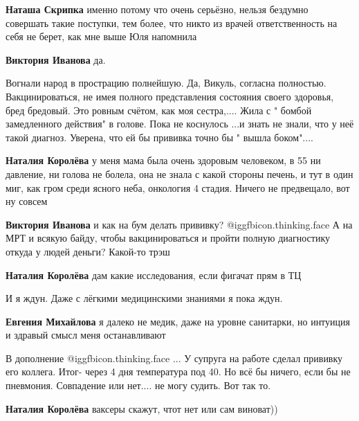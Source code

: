 \begin{itemize}
\begin{itemize} %
\textbf{Наташа Скрипка} именно потому что очень серьёзно, нельзя бездумно совершать такие поступки, тем более, что никто из врачей ответственность на себя не берет, как мне выше Юля напомнила

\textbf{Виктория Иванова} да.
\end{itemize} %


Вогнали народ в прострацию полнейшую. Да, Викуль, согласна полностью.
Вакцинироваться, не имея полного представления состояния своего здоровья, бред
бредовый. Это ровным счётом, как моя сестра,.... Жила с " бомбой замедленного
действия" в голове. Пока не коснулось ...и знать не знали, что у неё такой
диагноз. Уверена, что ей бы прививка точно бы " вышла боком"....

\begin{itemize} %
\textbf{Наталия Королёва} у меня мама была очень здоровым человеком, в 55 ни давление, ни голова не болела, она не знала с какой стороны печень, и тут в один миг, как гром среди ясного неба, онкология 4 стадия. Ничего не предвещало, вот ну совсем

\textbf{Виктория Иванова} и как на бум делать прививку?  @igg{fbicon.thinking.face}  А на МРТ и всякую байду, чтобы вакцинироваться и пройти полную диагностику откуда у людей деньги? Какой-то трэш

\textbf{Наталия Королёва} дам какие исследования, если фигачат прям в ТЦ
\end{itemize} %

И я ждун. Даже с лёгкими медицинскими знаниями я пока ждун.

\begin{itemize} %
\textbf{Евгения Михайлова} я далеко не медик, даже на уровне санитарки, но интуиция и здравый смысл меня останавливают
\end{itemize} %


В дополнение @igg{fbicon.thinking.face} ... У супруга на работе сделал прививку его коллега. Итог- через
4 дня температура под 40. Но всё бы ничего, если бы не пневмония. Совпадение
или нет.... не могу судить. Вот так то.

\begin{itemize} %
\textbf{Наталия Королёва} ваксеры скажут, чтот нет или сам виноват))


\end{itemize}
\end{itemize}
